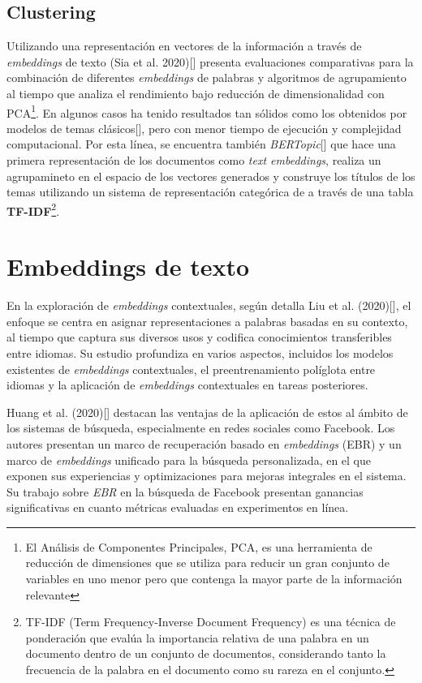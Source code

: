    \subsection{Clustering}
    Utilizando una representación en vectores de la información a través de \emph{embeddings} de texto (Sia et al. 2020)[\cite{sia2020tired}] presenta evaluaciones comparativas para la combinación de diferentes \emph{embeddings} de palabras y algoritmos de agrupamiento al tiempo que analiza el rendimiento bajo reducción de dimensionalidad con PCA\footnote{El Análisis de Componentes Principales, PCA, es una herramienta de reducción de dimensiones que se utiliza para reducir un gran conjunto de variables en uno menor pero que contenga la mayor parte de la información relevante}. En algunos casos ha tenido resultados tan sólidos como los obtenidos por modelos de temas clásicos[\cite{sia2020tiredResults}], pero con menor tiempo de ejecución y complejidad computacional. 
    Por esta línea, se encuentra también \emph{BERTopic}[\cite{bertopic}] que hace una primera representación de los documentos como \emph{text embeddings}, realiza un agrupamineto en el espacio de los vectores generados y construye los títulos de los temas utilizando un sistema de representación categórica de a través de una tabla \textbf{TF-IDF}\footnote{TF-IDF (Term Frequency-Inverse Document Frequency) es una técnica de ponderación que evalúa la importancia relativa de una palabra en un documento dentro de un conjunto de documentos, considerando tanto la frecuencia de la palabra en el documento como su rareza en el conjunto.}.

\section{Embeddings de texto}
    En la exploración de \emph{embeddings} contextuales, según detalla Liu et al. (2020)[\cite{liu2020survey}], el enfoque se centra en asignar representaciones a palabras basadas en su contexto, al tiempo que captura sus diversos usos y codifica conocimientos transferibles entre idiomas. Su estudio profundiza en varios aspectos, incluidos los modelos existentes de \emph{embeddings} contextuales, el preentrenamiento políglota entre idiomas y la aplicación de \emph{embeddings} contextuales en tareas posteriores.

    Huang et al. (2020)[\cite{Huang_2020}] destacan las ventajas de la aplicación de estos al ámbito de los sistemas de búsqueda, especialmente en redes sociales como Facebook. Los autores presentan un marco de recuperación basado en \emph{embeddings} (EBR) y un marco de \emph{embeddings} unificado para la búsqueda personalizada, en el que exponen sus experiencias y optimizaciones para mejoras integrales en el sistema. Su trabajo sobre \emph{EBR} en la búsqueda de Facebook presentan ganancias significativas en cuanto métricas evaluadas en experimentos en línea.

